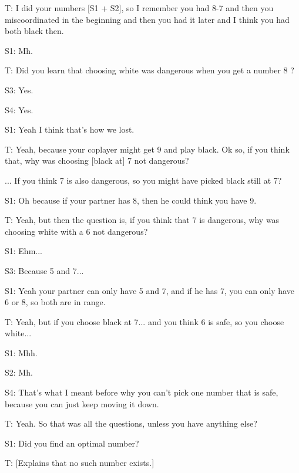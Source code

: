 \documentclass[a4paper,superscriptaddress,nofootinbib]{revtex4}
\begin{document}
T: I did your numbers [S1 + S2], so I remember you had 8-7 and then you miscoordinated in the beginning and then you had it later and I think you had both black then.

S1: Mh.

T: Did you learn that choosing white was dangerous when you get a number 8 ?

S3: Yes.

S4: Yes.

S1: Yeah I think that's how we lost.

T: Yeah, because your coplayer might get 9 and play black. Ok so, if you think that, why was choosing [black at] 7 not dangerous? 

... If you think 7 is also dangerous, so you might have picked black still at 7?

S1: Oh because if your partner has 8, then he could think you have 9.

T: Yeah, but then the question is, if you think that 7 is dangerous, why was choosing white with a 6 not dangerous?

S1: Ehm...

S3: Because 5 and 7...

S1: Yeah your partner can only have 5 and 7, and if he has 7, you can only have 6 or 8, so both are in range.

T: Yeah, but if you choose black at 7... and you think 6 is safe, so you choose white...

S1: Mhh.

S2: Mh.

S4: That's what I meant before why you can't pick one number that is safe, because you can just keep moving it down.

T: Yeah. So that was all the questions, unless you have anything else?

S1: Did you find an optimal number?

T: [Explains that no such number exists.]
 
\end{document}
